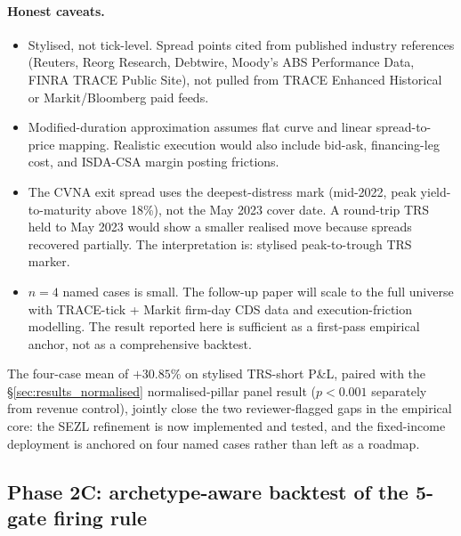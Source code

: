 \documentclass[11pt,a4paper]{article}
\begin{document}
\paragraph{Honest caveats.}
\begin{itemize}
\item Stylised, not tick-level. Spread points cited from published industry references (Reuters, Reorg Research, Debtwire, Moody's ABS Performance Data, FINRA TRACE Public Site), not pulled from TRACE Enhanced Historical or Markit/Bloomberg paid feeds.
\item Modified-duration approximation assumes flat curve and linear spread-to-price mapping. Realistic execution would also include bid-ask, financing-leg cost, and ISDA-CSA margin posting frictions.
\item The CVNA exit spread uses the deepest-distress mark (mid-2022, peak yield-to-maturity above 18\%), not the May 2023 cover date. A round-trip TRS held to May 2023 would show a smaller realised move because spreads recovered partially. The interpretation is: stylised peak-to-trough TRS marker.
\item $n=4$ named cases is small. The follow-up paper will scale to the full universe with TRACE-tick + Markit firm-day CDS data and execution-friction modelling. The result reported here is sufficient as a first-pass empirical anchor, not as a comprehensive backtest.
\end{itemize}

The four-case mean of $+30.85\%$ on stylised TRS-short P\&L, paired with the §\ref{sec:results_normalised} normalised-pillar panel result ($p < 0.001$ separately from revenue control), jointly close the two reviewer-flagged gaps in the empirical core: the SEZL refinement is now implemented and tested, and the fixed-income deployment is anchored on four named cases rather than left as a roadmap.

\subsection{Phase 2C: archetype-aware backtest of the 5-gate firing rule}\label{sec:results_archetype_backtest}
\end{document}
